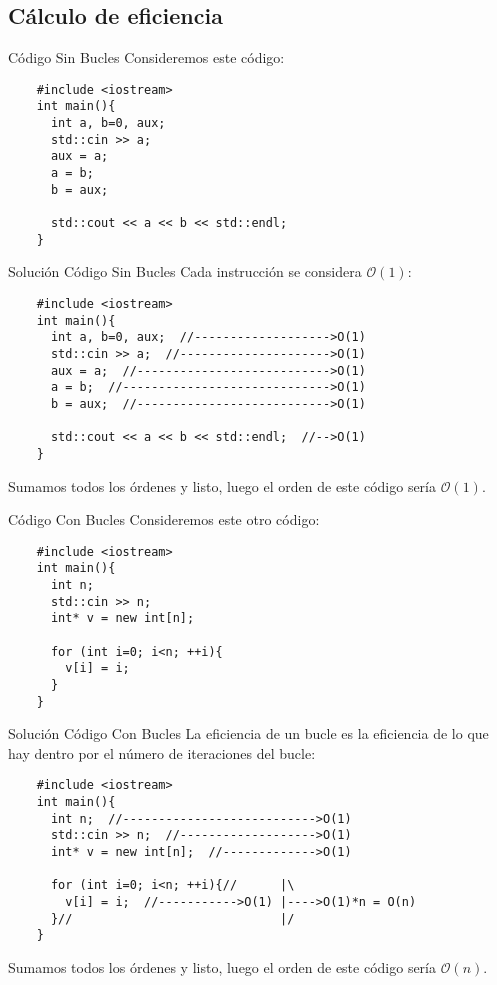 \documentclass[compress]{beamer}
\begin{document}
\subsection{Cálculo de eficiencia}

\begin{frame}[fragile]{Código Sin Bucles}
Consideremos este código:\\
\vspace{0.20in}
	\begin{lstlisting}
	#include <iostream>
	int main(){
	  int a, b=0, aux;
	  std::cin >> a;
	  aux = a;
	  a = b;
	  b = aux;
	
	  std::cout << a << b << std::endl;
	}
	\end{lstlisting}
\end{frame}

\begin{frame}[fragile]{Solución Código Sin Bucles}
Cada instrucción se considera $\mathcal{O}(1)$:
	\begin{lstlisting}
	#include <iostream>
	int main(){
	  int a, b=0, aux;  //------------------->O(1)
	  std::cin >> a;  //--------------------->O(1)
	  aux = a;  //--------------------------->O(1)
	  a = b;  //----------------------------->O(1)
	  b = aux;  //--------------------------->O(1)
	
	  std::cout << a << b << std::endl;  //-->O(1)
	}
	\end{lstlisting}
Sumamos todos los órdenes y listo, luego el orden de este código sería $\mathcal{O}(1)$.
\end{frame}

\begin{frame}[fragile]{Código Con Bucles}
Consideremos este otro código:\\
\vspace{0.20in}
	\begin{lstlisting}
	#include <iostream>
	int main(){
	  int n;
	  std::cin >> n;
	  int* v = new int[n];
	
	  for (int i=0; i<n; ++i){
	    v[i] = i;
	  }
	}
	\end{lstlisting}
\end{frame}

\begin{frame}[fragile]{Solución Código Con Bucles}
La eficiencia de un bucle es la eficiencia de lo que hay dentro por el número de iteraciones del bucle:\\
\vspace{0.20in}
	\begin{lstlisting}
	#include <iostream>
	int main(){
	  int n;  //--------------------------->O(1)
	  std::cin >> n;  //------------------->O(1)
	  int* v = new int[n];  //------------->O(1)
	
	  for (int i=0; i<n; ++i){//      |\
	    v[i] = i;  //----------->O(1) |---->O(1)*n = O(n)
	  }//                             |/
	}
	\end{lstlisting}
Sumamos todos los órdenes y listo, luego el orden de este código sería $\mathcal{O}(n)$.
\end{frame}
\end{document}
